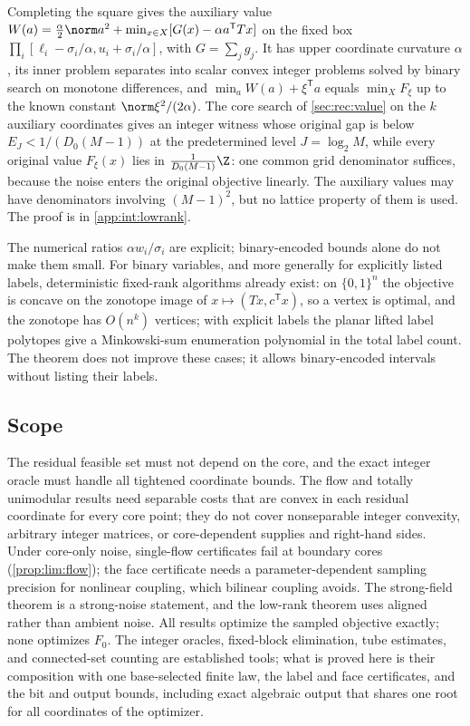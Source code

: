Completing the square gives the auxiliary value
$W(a)=\frac\alpha2\norm a^2+\min_{x\in X}[G(x)-\alpha a^{\mathsf T}Tx]$ on the
fixed box $\prod_i[\ell_i-\sigma_i/\alpha,u_i+\sigma_i/\alpha]$, with
$G=\sum_jg_j$. It has upper coordinate curvature $\alpha$, its inner problem
separates into scalar convex integer problems solved by binary search on
monotone differences, and $\min_aW(a)+\xi^{\mathsf T}a$ equals $\min_XF_\xi$ up to
the known constant $\norm\xi^2/(2\alpha)$. The core search of
\cref{sec:rec:value} on the $k$ auxiliary coordinates gives an integer witness
whose original gap is below $E_J<1/(D_0(M-1))$ at the predetermined level
$J=\log_2M$, while every original value $F_\xi(x)$ lies in
$\frac1{D_0(M-1)}\Z$: one common grid denominator suffices, because the noise
enters the original objective linearly. The auxiliary values may have
denominators involving $(M-1)^2$, but no lattice property of them is used. The
proof is in \cref{app:int:lowrank}.

The numerical ratios $\alpha w_i/\sigma_i$ are explicit; binary-encoded bounds
alone do not make them small. For binary variables, and more generally for
explicitly listed labels, deterministic fixed-rank algorithms already exist: on
$\{0,1\}^n$ the objective is concave on the zonotope image of
$x\mapsto(Tx,c^{\mathsf T}x)$, so a vertex is optimal, and the zonotope has
$O(n^k)$ vertices; with explicit labels the planar lifted label polytopes give
a Minkowski-sum enumeration polynomial in the total label count. The theorem
does not improve these cases; it allows binary-encoded intervals without listing
their labels.

\subsection{Scope}\label{sec:int:scope}

The residual feasible set must not depend on the core, and the exact integer
oracle must handle all tightened coordinate bounds. The flow and totally
unimodular results need separable costs that are convex in each residual
coordinate for every core point; they do not cover nonseparable integer
convexity, arbitrary integer matrices, or core-dependent supplies and
right-hand sides. Under core-only noise, single-flow certificates fail at
boundary cores (\cref{prop:lim:flow}); the face certificate needs a
parameter-dependent sampling precision for nonlinear coupling, which bilinear
coupling avoids. The strong-field theorem is a strong-noise statement, and the
low-rank theorem uses aligned rather than ambient noise. All results optimize
the sampled objective exactly; none optimizes $F_0$. The integer oracles,
fixed-block elimination, tube estimates, and connected-set counting are
established tools; what is proved here is their composition with one
base-selected finite law, the label and face certificates, and the bit and
output bounds, including exact algebraic output that shares one root for all
coordinates of the optimizer.
